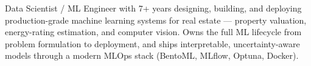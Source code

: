 
\begin{cvparagraph}
Data Scientist / ML Engineer with 7+ years designing, building, and deploying production-grade machine learning systems for real estate — property valuation, energy-rating estimation, and computer vision. Owns the full ML lifecycle from problem formulation to deployment, and ships interpretable, uncertainty-aware models through a modern MLOps stack (BentoML, MLflow, Optuna, Docker).
\end{cvparagraph}
